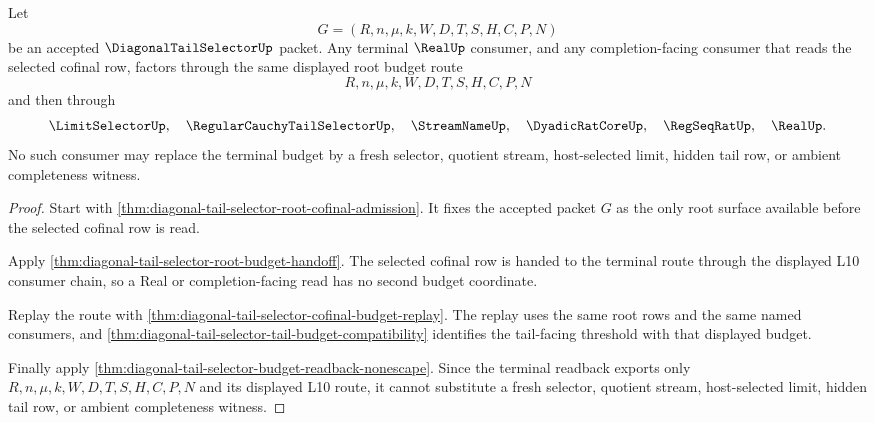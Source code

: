 \begin{theorem}
\label{thm:diagonal-tail-selector-terminal-budget-determinacy}
Let
$$
G=(R,n,\mu,k,W,D,T,S,H,C,P,N)
$$
be an accepted $\DiagonalTailSelectorUp$ packet. Any terminal $\RealUp$
consumer, and any completion-facing consumer that reads the selected cofinal
row, factors through the same displayed root budget route
$$
R,n,\mu,k,W,D,T,S,H,C,P,N
$$
and then through
$$
\LimitSelectorUp,\quad
\RegularCauchyTailSelectorUp,\quad
\StreamNameUp,\quad
\DyadicRatCoreUp,\quad
\RegSeqRatUp,\quad
\RealUp.
$$
No such consumer may replace the terminal budget by a fresh selector,
quotient stream, host-selected limit, hidden tail row, or ambient
completeness witness.
\end{theorem}
\begin{proof}
Start with \autoref{thm:diagonal-tail-selector-root-cofinal-admission}. It
fixes the accepted packet $G$ as the only root surface available before the
selected cofinal row is read.

Apply \autoref{thm:diagonal-tail-selector-root-budget-handoff}. The selected
cofinal row is handed to the terminal route through the displayed L10
consumer chain, so a Real or completion-facing read has no second budget
coordinate.

Replay the route with
\autoref{thm:diagonal-tail-selector-cofinal-budget-replay}. The replay uses
the same root rows and the same named consumers, and
\autoref{thm:diagonal-tail-selector-tail-budget-compatibility} identifies the
tail-facing threshold with that displayed budget.

Finally apply
\autoref{thm:diagonal-tail-selector-budget-readback-nonescape}. Since the
terminal readback exports only $R,n,\mu,k,W,D,T,S,H,C,P,N$ and its displayed
L10 route, it cannot substitute a fresh selector, quotient stream,
host-selected limit, hidden tail row, or ambient completeness witness.
\end{proof}

